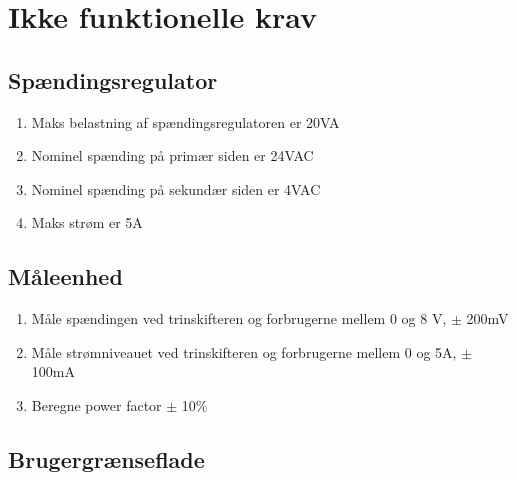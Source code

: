 
\section{Ikke funktionelle krav}

\subsection{Spændingsregulator}
\begin{enumerate}
	\item Maks belastning af spændingsregulatoren er 20VA
	\item Nominel spænding på primær siden er 24VAC
	\item Nominel spænding på sekundær siden er 4VAC
	\item Maks strøm er 5A	
\end{enumerate}

\subsection{Måleenhed}

\begin{enumerate}
	\item Måle spændingen ved trinskifteren og forbrugerne mellem 0 og 8 V, $\pm$ 200mV 
	\item Måle strømniveauet ved trinskifteren og forbrugerne mellem 0 og 5A, $\pm$ 100mA
	\item Beregne power factor $\pm$ 10$\%$
\end{enumerate}

\subsection{Brugergrænseflade}

